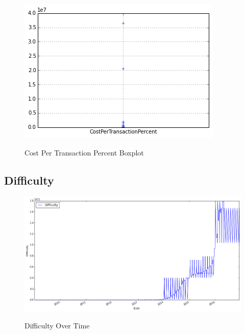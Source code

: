 \begin{figure}[bth]
  \myfloatalign
  {\includegraphics[width=1\linewidth]
    {gfx/cost-per-transaction-percent-boxplot}}
  \caption{Cost Per Transaction Percent Boxplot}
  \label{fig:cost-per-transaction-percent-boxplot}
\end{figure}

\clearpage

\subsection{Difficulty}
\label{sec:difficulty}

\begin{figure}[bth]
  \myfloatalign
  {\includegraphics[width=1\linewidth]
    {gfx/difficulty-over-time}}
  \caption{Difficulty Over Time}
  \label{fig:difficulty-over-time}
\end{figure}

